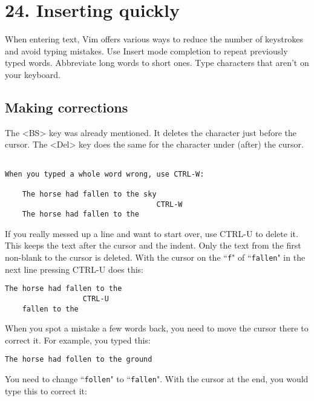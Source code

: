 \section{24. Inserting quickly}
When entering text, Vim offers various ways to reduce the number of keystrokes and avoid typing mistakes.
Use Insert mode completion to repeat previously typed words.
Abbreviate long words to short ones.
Type characters that aren't on your keyboard.
\localtableofcontents
\subsection{Making corrections}
The <BS> key was already mentioned.
It deletes the character just before the cursor.
The <Del> key does the same for the character under (after) the cursor.

\begin{Verbatim}[samepage=true]

When you typed a whole word wrong, use CTRL-W:

    The horse had fallen to the sky 
                                   CTRL-W
    The horse had fallen to the 
\end{Verbatim}

If you really messed up a line and want to start over, use CTRL-U to delete it.
This keeps the text after the cursor and the indent.
Only the text from the first non-blank to the cursor is deleted.
With the cursor on the ``\texttt{f}" of ``\texttt{fallen}" in the next line pressing CTRL-U does this:

\begin{Verbatim}[samepage=true]
    The horse had fallen to the 
                  CTRL-U
    fallen to the 
\end{Verbatim}

When you spot a mistake a few words back, you need to move the cursor there to correct it.
For example, you typed this:

\begin{Verbatim}[samepage=true]
    The horse had follen to the ground 
\end{Verbatim}

You need to change ``\texttt{follen}" to ``\texttt{fallen}".
With the cursor at the end, you would type this to correct it:

